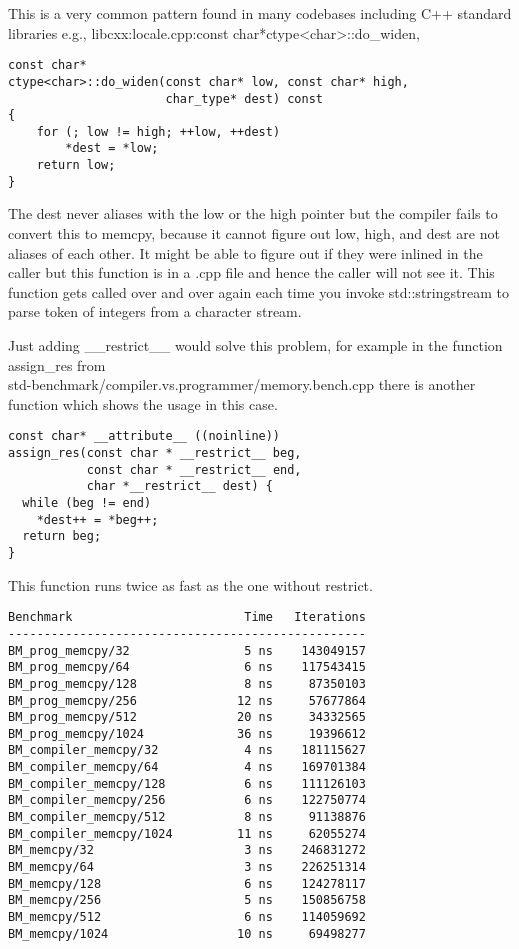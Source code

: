 \documentclass{sig-alternate}
\begin{document}
This is a very common pattern found in many codebases including C++ standard
libraries e.g., libcxx:locale.cpp:const char*ctype<char>::do\_widen,

\begin{verbatim}
const char*
ctype<char>::do_widen(const char* low, const char* high,
                      char_type* dest) const
{
    for (; low != high; ++low, ++dest)
        *dest = *low;
    return low;
}
\end{verbatim}

The dest never aliases with the low or the high pointer but the compiler fails
to convert this to memcpy, because it cannot figure out low, high, and dest are
not aliases of each other.  It might be able to figure out if they were inlined
in the caller but this function is in a .cpp file and hence the caller will not
see it. This function gets called over and over again each time you invoke
std::stringstream to parse token of integers from a character stream.

Just adding \_\_restrict\_\_ would solve this problem, for example in the
function assign\_res
from\\ std-benchmark/compiler.vs.programmer/memory.bench.cpp there is another
function which shows the usage in this case.

\begin{verbatim}
const char* __attribute__ ((noinline))
assign_res(const char * __restrict__ beg,
           const char * __restrict__ end,
           char *__restrict__ dest) {
  while (beg != end)
    *dest++ = *beg++;
  return beg;
}
\end{verbatim}

This function runs twice as fast as the one without restrict.

\begin{verbatim}
Benchmark                        Time   Iterations
--------------------------------------------------
BM_prog_memcpy/32                5 ns    143049157
BM_prog_memcpy/64                6 ns    117543415
BM_prog_memcpy/128               8 ns     87350103
BM_prog_memcpy/256              12 ns     57677864
BM_prog_memcpy/512              20 ns     34332565
BM_prog_memcpy/1024             36 ns     19396612
BM_compiler_memcpy/32            4 ns    181115627
BM_compiler_memcpy/64            4 ns    169701384
BM_compiler_memcpy/128           6 ns    111126103
BM_compiler_memcpy/256           6 ns    122750774
BM_compiler_memcpy/512           8 ns     91138876
BM_compiler_memcpy/1024         11 ns     62055274
BM_memcpy/32                     3 ns    246831272
BM_memcpy/64                     3 ns    226251314
BM_memcpy/128                    6 ns    124278117
BM_memcpy/256                    5 ns    150856758
BM_memcpy/512                    6 ns    114059692
BM_memcpy/1024                  10 ns     69498277
\end{verbatim}
\end{document}
